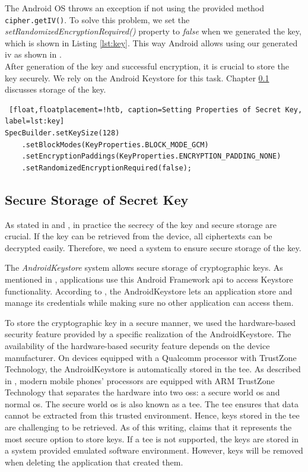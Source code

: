 The Android OS throws an exception if not using the provided method \texttt{cipher.getIV()}. To solve this problem, we set the \textit{setRandomizedEncryptionRequired()} property to \textit{false} when we generated the key, which is shown in Listing \ref{lst:key}. This way Android allows using our generated \gls{iv} as shown in \cite{SecretsInAndroid}. \\
After generation of the key and successful encryption, it is crucial to store the key securely. We rely on the Android Keystore for this task. Chapter \ref{arch_keystore} discusses storage of the key. \\


\begin{lstlisting} [float,floatplacement=!htb, caption=Setting Properties of Secret Key, label=lst:key]
SpecBuilder.setKeySize(128)
    .setBlockModes(KeyProperties.BLOCK_MODE_GCM)
    .setEncryptionPaddings(KeyProperties.ENCRYPTION_PADDING_NONE)
    .setRandomizedEncryptionRequired(false);
\end{lstlisting}




\subsection{Secure Storage of Secret Key} \label{arch_keystore}
As stated in \cite{dworkin2007sp} and \cite{CooijmansRP14},  in practice the secrecy of the key and secure storage are crucial. If the key can be retrieved from the device, all ciphertexts can be decrypted easily. Therefore, we need a system to ensure secure storage of the key.

The \textit{AndroidKeystore} system allows secure storage of cryptographic keys. As mentioned in \cite{HWBKeyStore}, applications use this Android Framework \gls{api} to access Keystore functionality. According to \cite{AndroidKeyStoreSystem}, the AndroidKeystore lets an application store and manage its credentials while making sure no other application can access them.

To store the cryptographic key in a secure manner, we used the hardware-based security feature provided by a specific realization of the AndroidKeystore. The availability of the hardware-based security feature depends on the device manufacturer. 
On devices equipped with a Qualcomm processor with TrustZone Technology, the AndroidKeystore is automatically stored in the \acrfull{tee}. As described in \cite{CooijmansRP14}, modern mobile phones' processors are equipped with ARM TrustZone Technology that separates the hardware into two \glspl{os}: a secure world \gls{os} and normal \gls{os}. The secure world \gls{os} is also known as a \gls{tee}. The \gls{tee} ensures that data cannot be extracted from this trusted environment. Hence, keys stored in the \gls{tee} are challenging to be retrieved.
As of this writing, \cite{SecureDataEncryption} claims that it represents the most secure option to store keys. If a \gls{tee} is not supported, the keys are stored in a system provided emulated software environment. However, keys will be removed when deleting the application that created them.

